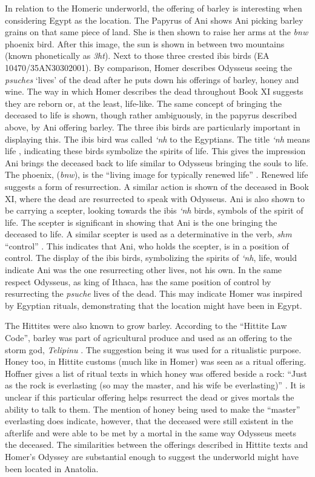 	In relation to the Homeric underworld, the offering of barley is interesting when considering Egypt as the location. The Papyrus of Ani shows Ani picking barley grains on that same piece of land. She is then shown to raise her arms at the \emph{bnw} phoenix bird. After this image, the sun is shown in between two mountains (known phonetically as \emph{3ht}). Next to those three crested ibis birds (EA 10470/35AN30302001). By comparison, Homer describes Odysseus seeing the \emph{psuches} ‘lives’ of the dead after he puts down his offerings of barley, honey and wine.  The way in which Homer describes the dead throughout Book XI suggests they are reborn or, at the least, life-like. The same concept of bringing the deceased to life is shown, though rather ambiguously, in the papyrus described above, by Ani offering barley. The three ibis birds are particularly important in displaying this. The ibis bird was called \emph{‘nh} to the Egyptians. The title \emph{‘nh} means life \parencite[153]{Collier1998}, indicating these birds symbolize the spirits of life. This gives the impression Ani brings the deceased back to life similar to Odysseus bringing the souls to life.  The phoenix, (\emph{bnw}), is the “living image for typically renewed life” \parencite[108]{Betro1996}. Renewed life suggests a form of resurrection. A similar action is shown of the deceased in Book XI, where the dead are resurrected to speak with Odysseus. Ani is also shown to be carrying a scepter, looking towards the ibis \emph{‘nh} birds, symbols of the spirit of life. The scepter is significant in showing that Ani is the one bringing the deceased to life. A similar scepter is used as a determinative in the verb, \emph{shm} “control” \parencite[159]{Collier1998}. This indicates that Ani, who holds the scepter, is in a position of control. The display of the ibis birds, symbolizing the spirits of \emph{‘nh}, life, would indicate Ani was the one resurrecting other lives, not his own. In the same respect Odysseus, as king of Ithaca, has the same position of control by resurrecting the \emph{psuche} lives of the dead. This may indicate Homer was inspired by Egyptian rituals, demonstrating that the location might have been in Egypt.
		
	The Hittites were also known to grow barley. According to the “Hittite Law Code”, barley was part of agricultural produce \parencite[86]{Gurney1990} and used as an offering to the storm god, \emph{Telipinu} \parencite[124]{Hoffner1997}. The suggestion being it was used for a ritualistic purpose.  Honey too, in Hittite customs (much like in Homer) was seen as a ritual offering. Hoffner gives a list of ritual texts in which honey was offered beside a rock: “Just as the rock is everlasting (so may the master, and his wife be everlasting)” \parencite[346]{Hoffner1997}. It is unclear if this particular offering helps resurrect the dead or gives mortals the ability to talk to them. The mention of honey being used to make the “master” everlasting does indicate, however, that the deceased were still existent in the afterlife and were able to be met by a mortal in the same way Odysseus meets the deceased. The similarities between the offerings described in Hittite texts and Homer’s Odyssey are substantial enough to suggest the underworld might have been located in Anatolia.
	
